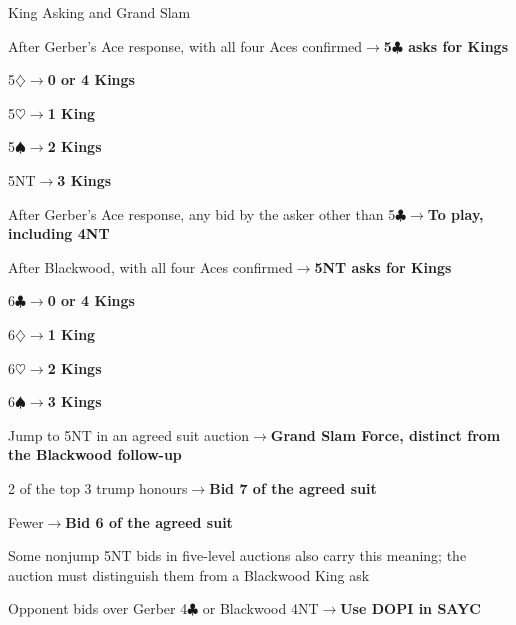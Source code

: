 \documentclass[10pt,letterpaper]{article}
\newcommand{\C}{\ensuremath{\clubsuit}}
\newcommand{\D}{\ensuremath{\diamondsuit}}
\newcommand{\Hh}{\ensuremath{\heartsuit}}
\renewcommand{\S}{\ensuremath{\spadesuit}}
\begin{document}
\begin{minipage}[t]{0.485\textwidth}\vspace{0pt}

\begin{guidecard}{King Asking and Grand Slam}
\begin{branches}
\item After Gerber's Ace response, with all four Aces confirmed\;\ensuremath{\longrightarrow}\;\textbf{5\C{} asks for Kings}
\begin{branches}
\item 5\D{}\;\ensuremath{\longrightarrow}\;\textbf{0 or 4 Kings}
\item 5\Hh{}\;\ensuremath{\longrightarrow}\;\textbf{1 King}
\item 5\S{}\;\ensuremath{\longrightarrow}\;\textbf{2 Kings}
\item 5NT\;\ensuremath{\longrightarrow}\;\textbf{3 Kings}
\end{branches}
\item After Gerber's Ace response, any bid by the asker other than 5\C{}\;\ensuremath{\longrightarrow}\;\textbf{To play, including 4NT}
\item After Blackwood, with all four Aces confirmed\;\ensuremath{\longrightarrow}\;\textbf{5NT asks for Kings}
\begin{branches}
\item 6\C{}\;\ensuremath{\longrightarrow}\;\textbf{0 or 4 Kings}
\item 6\D{}\;\ensuremath{\longrightarrow}\;\textbf{1 King}
\item 6\Hh{}\;\ensuremath{\longrightarrow}\;\textbf{2 Kings}
\item 6\S{}\;\ensuremath{\longrightarrow}\;\textbf{3 Kings}
\end{branches}
\item Jump to 5NT in an agreed suit auction\;\ensuremath{\longrightarrow}\;\textbf{Grand Slam Force, distinct from the Blackwood follow-up}
\begin{branches}
\item 2 of the top 3 trump honours\;\ensuremath{\longrightarrow}\;\textbf{Bid 7 of the agreed suit}
\item Fewer\;\ensuremath{\longrightarrow}\;\textbf{Bid 6 of the agreed suit}
\item Some nonjump 5NT bids in five-level auctions also carry this meaning; the auction must distinguish them from a Blackwood King ask
\end{branches}
\item Opponent bids over Gerber 4\C{} or Blackwood 4NT\;\ensuremath{\longrightarrow}\;\textbf{Use DOPI in SAYC}

\end{branches}
\end{guidecard}
\end{minipage}
\end{document}
